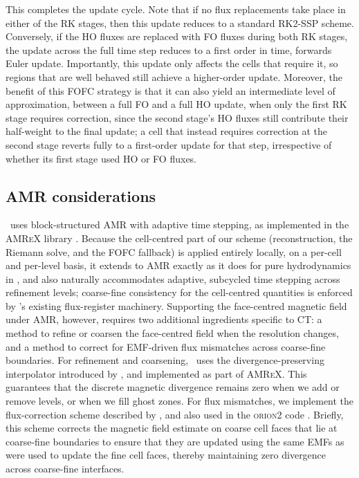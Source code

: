 This completes the update cycle. Note that if no flux replacements take place in either of the RK stages, then this update reduces to a standard RK2-SSP scheme. Conversely, if the HO fluxes are replaced with FO fluxes during both RK stages, the update across the full time step reduces to a first order in time, forwards Euler update. Importantly, this update only affects the cells that require it, so regions that are well behaved still achieve a higher-order update. Moreover, the benefit of this FOFC strategy is that it can also yield an intermediate level of approximation, between a full FO and a full HO update, when only the first RK stage requires correction, since the second stage's HO fluxes still contribute their half-weight to the final update; a cell that instead requires correction at the second stage reverts fully to a first-order update for that step, irrespective of whether its first stage used HO or FO fluxes.

\subsection{AMR considerations}
\label{sec:methods:amr}

\quokka~uses \citet{Berger84a} block-structured AMR with \citet{Berger89a} adaptive time stepping, as implemented in the \textsc{AMReX} library \citep{Zhang19b}. Because the cell-centred part of our scheme (reconstruction, the Riemann solve, and the FOFC fallback) is applied entirely locally, on a per-cell and per-level basis, it extends to AMR exactly as it does for pure hydrodynamics in , and also naturally accommodates adaptive, subcycled time stepping across refinement levels; coarse-fine consistency for the cell-centred quantities is enforced by \quokka's existing flux-register machinery. Supporting the face-centred magnetic field under AMR, however, requires two additional ingredients specific to CT: a method to refine or coarsen the face-centred field when the resolution changes, and a method to correct for EMF-driven flux mismatches across coarse-fine boundaries. For refinement and coarsening, \quokka~uses the divergence-preserving interpolator introduced by \citet{Vanella10a}, and implemented as part of \textsc{AMReX}. This guarantees that the discrete magnetic divergence remains zero when we add or remove levels, or when we fill ghost zones. For flux mismatches, we implement the flux-correction scheme described by \citet{Balsara01a}, and also used in the \textsc{orion2} code \citep{Li12a}. Briefly, this scheme corrects the magnetic field estimate on coarse cell faces that lie at coarse-fine boundaries to ensure that they are updated using the same EMFs as were used to update the fine cell faces, thereby maintaining zero divergence across coarse-fine interfaces.


